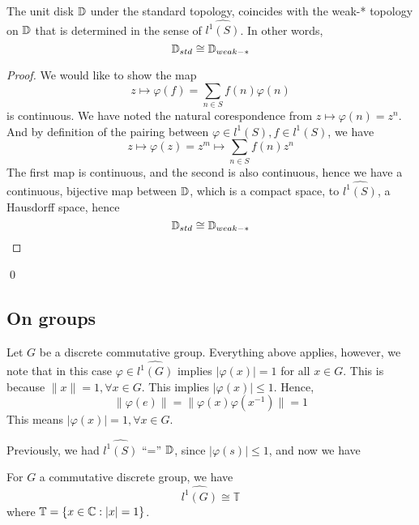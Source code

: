\begin{proposition}
    The unit disk $\mathbb{D}$ under the standard topology, coincides with the weak-* topology on $\mathbb{D}$ that is determined in the sense of $\widehat{l^1(S)}$. In other words,
    \begin{equation*}
        \mathbb{D}_{std}\cong \mathbb{D}_{weak-*}
    \end{equation*}
\end{proposition}
\begin{proof}
    We would like to show the map
    \begin{equation*}
        z\mapsto\varphi(f)=\sum_{n\in S}f(n)\varphi(n)
    \end{equation*}
    is continuous. We have noted the natural corespondence from $z\mapsto \varphi(n)=z^n$. And by definition of the pairing between $\varphi\in l^1(S), f\in l^1(S)$, we have
    \begin{equation*}
        z\mapsto \varphi(z)=z^m\mapsto \sum_{n\in S}f(n)z^n
    \end{equation*}
    The first map is continuous, and the second is also continuous, hence we have a continuous, bijective map between $\mathbb{D}$, which is a compact space, to $\widehat{l^1(S)}$, a Hausdorff space, hence
    \begin{equation*}
        \mathbb{D}_{std}\cong\mathbb{D}_{weak-*}
    \end{equation*}
\end{proof}
\qed

\subsection{On groups}
Let $G$ be a discrete commutative group. Everything above applies, however, we note that in this case $\varphi\in\widehat{l^1(G)}$ implies $|\varphi(x)|=1$ for all $x\in G$.
This is because $\|x\|=1, \forall x\in G$. This implies $|\varphi(x)|\leq 1$. Hence,
\begin{equation*}
    \|\varphi(e)\|=\|\varphi(x)\varphi(x^{-1})\|=1
\end{equation*}
This means $|\varphi(x)|=1, \forall x\in G$.

Previously, we had $\widehat{l^1(S)}$ ``='' $\mathbb{D}$, since $|\varphi(s)|\leq 1$, and now we have
\begin{proposition}
    For $G$ a commutative discrete group, we have
    \begin{equation*}
        \widehat{l^1(G)}\cong \mathbb{T}
    \end{equation*}
    where $\mathbb{T}=\{x\in\mathbb{C}: |x|=1\}$.
\end{proposition}

